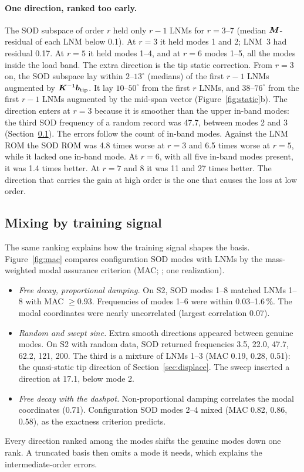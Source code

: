 \documentclass[preprint,12pt]{elsarticle}
\begin{document}
\paragraph{One direction, ranked too early.} The SOD subspace of order $r$ held only $r-1$ LNMs for $r=3$--7 (median $\bm{M}$-residual of each LNM below 0.1). At $r=3$ it held modes 1 and 2; LNM~3 had residual 0.17. At $r=5$ it held modes 1--4, and at $r=6$ modes 1--5, all the modes inside the load band.
The extra direction is the tip static correction. From $r=3$ on, the SOD subspace lay within $2$--$13^\circ$ (medians) of the first $r-1$ LNMs augmented by $\bm{K}^{-1}\bm{b}_{\mathrm{tip}}$. It lay $10$--$50^\circ$ from the first $r$ LNMs, and $38$--$76^\circ$ from the first $r-1$ LNMs augmented by the mid-span vector (Figure~\ref{fig:static}b).
The direction enters at $r=3$ because it is smoother than the upper in-band modes: the third SOD frequency of a random record was 47.7, between modes 2 and 3 (Section~\ref{sec:mix}).
The errors follow the count of in-band modes. Against the LNM ROM the SOD ROM was 4.8 times worse at $r=3$ and 6.5 times worse at $r=5$, while it lacked one in-band mode. At $r=6$, with all five in-band modes present, it was 1.4 times better. At $r=7$ and 8 it was 11 and 27 times better.
The direction that carries the gain at high order is the one that causes the loss at low order.

\subsection{Mixing by training signal}\label{sec:mix}
The same ranking explains how the training signal shapes the basis.
Figure~\ref{fig:mac} compares configuration SOD modes with LNMs by the mass-weighted modal assurance criterion (MAC; \citealp{Allemang2003}; one realization).
\begin{itemize}
\item \emph{Free decay, proportional damping.} On S2, SOD modes 1--8 matched LNMs 1--8 with MAC $\ge0.93$. Frequencies of modes 1--6 were within 0.03--1.6\,\%. The modal coordinates were nearly uncorrelated (largest correlation 0.07).
\item \emph{Random and swept sine.} Extra smooth directions appeared between genuine modes. On S2 with random data, SOD returned frequencies 3.5, 22.0, 47.7, 62.2, 121, 200. The third is a mixture of LNMs 1--3 (MAC 0.19, 0.28, 0.51): the quasi-static tip direction of Section~\ref{sec:displace}. The sweep inserted a direction at 17.1, below mode 2.
\item \emph{Free decay with the dashpot.} Non-proportional damping correlates the modal coordinates (0.71). Configuration SOD modes 2--4 mixed (MAC 0.82, 0.86, 0.58), as the exactness criterion predicts.
\end{itemize}
Every direction ranked among the modes shifts the genuine modes down one rank. A truncated basis then omits a mode it needs, which explains the intermediate-order errors.
\end{document}
